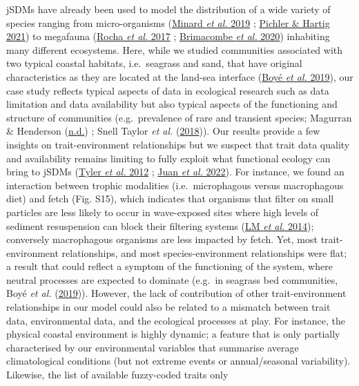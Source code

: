 \documentclass[9pt,biorxiv,doublespacing,lineno,endfloat]{lapreprint}
\begin{document}
jSDMs have already been used to model the distribution of a wide variety
of species ranging from micro-organisms
(\protect\hyperlink{ref-Minard_2019}{Minard \emph{et al.} 2019} ;
\protect\hyperlink{ref-Pichler_2021}{Pichler \& Hartig 2021}) to
megafauna (\protect\hyperlink{ref-Rocha_2017}{Rocha \emph{et al.} 2017}
; \protect\hyperlink{ref-Brimacombe_2020}{Brimacombe \emph{et al.}
2020}) inhabiting many different ecosystems. Here, while we studied
communities associated with two typical coastal habitats, i.e.~seagrass
and sand, that have original characteristics as they are located at the
land-sea interface (\protect\hyperlink{ref-Boye_2019a}{Boyé \emph{et
al.} 2019}), our case study reflects typical aspects of data in
ecological research such as data limitation and data availability but
also typical aspects of the functioning and structure of communities
(e.g.~prevalence of rare and transient species; Magurran \& Henderson
(\protect\hyperlink{ref-Magurran_2003}{n.d.}) ; Snell Taylor \emph{et
al.} (\protect\hyperlink{ref-SnellTaylor_2018}{2018})). Our results
provide a few insights on trait-environment relationships but we suspect
that trait data quality and availability remains limiting to fully
exploit what functional ecology can bring to jSDMs
(\protect\hyperlink{ref-Tyler_2012}{Tyler \emph{et al.} 2012} ;
\protect\hyperlink{ref-deJuan_2022}{Juan \emph{et al.} 2022}). For
instance, we found an interaction between trophic modalities
(i.e.~microphagous versus macrophagous diet) and fetch (Fig. S15), which
indicates that organisms that filter on small particles are less likely
to occur in wave-exposed sites where high levels of sediment
resuspension can block their filtering systems
(\protect\hyperlink{ref-Manning_2014}{LM \emph{et al.} 2014});
conversely macrophagous organisms are less impacted by fetch. Yet, most
trait-environment relationships, and most species-environment
relationships were flat; a result that could reflect a symptom of the
functioning of the system, where neutral processes are expected to
dominate (e.g.~in seagrass bed communities, Boyé \emph{et al.}
(\protect\hyperlink{ref-Boye_2019a}{2019})). However, the lack of
contribution of other trait-environment relationships in our model could
also be related to a mismatch between trait data, environmental data,
and the ecological processes at play. For instance, the physical coastal
environment is highly dynamic; a feature that is only partially
characterised by our environmental variables that summarise average
climatological conditions (but not extreme events or annual/seasonal
variability). Likewise, the list of available fuzzy-coded traits only
\end{document}
